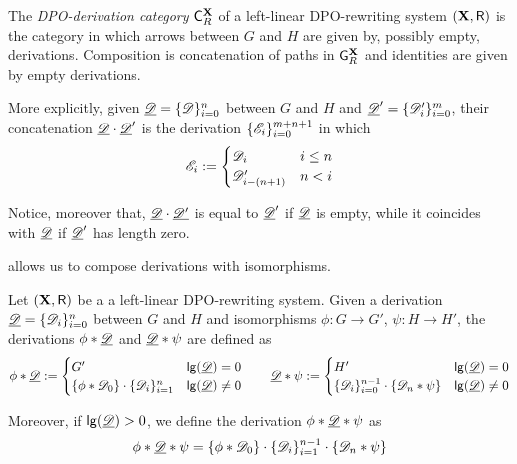 \begin{example}
\end{example}

\begin{definition}
	The \emph{DPO-derivation category} $\mathsf{C}^{\textbf {\textup{X}}}_R$ of a left-linear DPO-rewriting system $(\textbf {\textup{X}}, \mathsf{R})$ is the category in which arrows between $G$ and $H$ are given by, possibly empty, derivations. Composition is concatenation of paths in $\mathsf{G}^{\textbf {\textup{X}}}_R$ and identities are given by empty derivations.
\end{definition} 	
\begin{remark}
	More explicitly, given $\underline{\mathscr{D}}=\{\mathscr{D}\}_{i=0}^n$ between $G$ and $H$ and $\underline{\mathscr{D}}'=\{\mathscr{D}'_i\}_{i=0}^m$, their concatenation $\underline{\mathscr{D}}\cdot\underline{\mathscr{D}}'$ is the derivation $\{\mathscr{E}_i\}_{i=0}^{m+n+1}$ in which
	\[\mathscr{E}_i:=\begin{cases}
		\mathscr{D}_i & i \leq n\\
		\mathscr{D}'_{i-(n+1)} & n< i 
	\end{cases}\]	

Notice, moreover that, $\underline{\mathscr{D}}\cdot \underline{\mathscr{D'}}$ is equal to $\underline{\mathscr{D}}'$ if $\underline{\mathscr{D}}$ is empty, while it coincides with $\underline{\mathscr{D}}$ if $\underline{\mathscr{D}}'$ has length zero.
\end{remark}

  allows us to compose derivations with isomorphisms.

\begin{definition} Let $(\textbf {\textup{X}}, \mathsf{R})$ be a a left-linear DPO-rewriting system. Given a derivation $\underline{\mathscr{D}}=\{\mathscr{D}_{i}\}_{i=0}^n$ between $G$ and $H$ and isomorphisms $\phi\colon G\to G'$, $\psi\colon H\to H'$, the derivations  $\phi*\underline{\mathscr{D}}$ and $\underline{\mathscr{D}}*\psi$ are defined as
	\[\phi *\underline{\mathscr{D}} := \begin{cases}
		G' & \mathsf{lg}(\underline{\mathscr{D}})=0\\ 
		\{\phi* \mathscr{D}_0\}\cdot \{\mathscr{D}_i\}_{i=1}^{n}  & \mathsf{lg}(\underline{\mathscr{D}})\neq 0
	\end{cases} \qquad \underline{\mathscr{D}}*\psi := \begin{cases}
	H' & \mathsf{lg}(\underline{\mathscr{D}})=0\\ 
	\{\mathscr{D}_i\}_{i=0}^{n-1} \cdot \{\mathscr{D}_n*\psi\} & \mathsf{lg}(\underline{\mathscr{D}})\neq 0
	\end{cases}\] 

	Moreover, if $\mathsf{lg}(\underline{\mathscr{D}})>0$,  we define the derivation $\phi *\underline{\mathscr{D}} * \psi$ as
	\[\phi *\underline{\mathscr{D}} * \psi = \{\phi* \mathscr{D}_0\}\cdot \{\mathscr{D}_i\}_{i=1}^{n-1} \cdot \{\mathscr{D}_n*\psi\}\] 
\end{definition}

